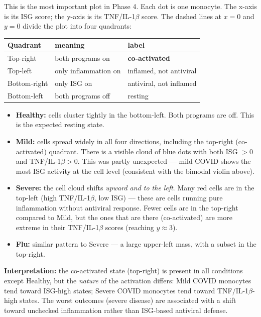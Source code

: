 \documentclass[11pt, a4paper]{article}
\begin{document}
This is the most important plot in Phase 4.
Each dot is one monocyte. The x-axis is its ISG score; the y-axis is its
TNF/IL-1$\beta$ score. The dashed lines at $x = 0$ and $y = 0$ divide
the plot into four quadrants:

\begin{center}
\begin{tabular}{@{}p{3cm}p{5.5cm}p{4cm}@{}}
\toprule
\textbf{Quadrant} & \textbf{meaning} & \textbf{label} \\
\midrule
Top-right    & both programs on  & \textbf{co-activated} \\
Top-left     & only inflammation on & inflamed, not antiviral \\
Bottom-right & only ISG on       & antiviral, not inflamed \\
Bottom-left  & both programs off & resting \\
\bottomrule
\end{tabular}
\end{center}

\begin{itemize}[nosep]
  \item \textbf{Healthy:} cells cluster tightly in the bottom-left. Both programs
        are off. This is the expected resting state.
  \item \textbf{Mild:} cells spread widely in all four directions, including the
        top-right (co-activated) quadrant. There is a visible cloud of blue dots
        with both ISG $> 0$ and TNF/IL-1$\beta > 0$.
        This was partly unexpected — mild COVID shows the most ISG activity
        at the cell level (consistent with the bimodal violin above).
  \item \textbf{Severe:} the cell cloud shifts \textit{upward and to the left}.
        Many red cells are in the top-left (high TNF/IL-1$\beta$, low ISG) —
        these are cells running pure inflammation without antiviral response.
        Fewer cells are in the top-right compared to Mild, but the ones
        that are there (co-activated) are more extreme in their TNF/IL-1$\beta$
        scores (reaching $y \approx 3$).
  \item \textbf{Flu:} similar pattern to Severe — a large upper-left mass,
        with a subset in the top-right.
\end{itemize}

\textbf{Interpretation:} the co-activated state (top-right) is present in all
conditions except Healthy, but the \textit{nature} of the activation differs:
Mild COVID monocytes tend toward ISG-high states; Severe COVID monocytes
tend toward TNF/IL-1$\beta$-high states. The worst outcomes (severe disease)
are associated with a shift toward unchecked inflammation rather than
ISG-based antiviral defense.
\end{document}
